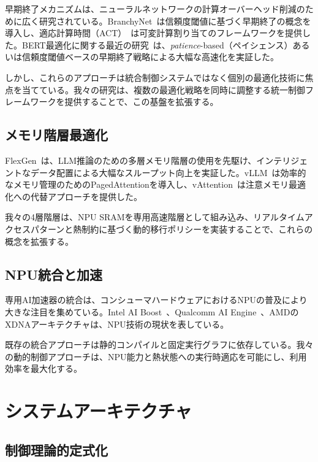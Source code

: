\documentclass[10pt,twocolumn,a4paper]{jarticle}
\begin{document}
早期終了メカニズムは、ニューラルネットワークの計算オーバーヘッド削減のために広く研究されている。BranchyNet~\cite{branchynet2016}は信頼度閾値に基づく早期終了の概念を導入し、適応計算時間（ACT）~\cite{graves2016act}は可変計算割り当てのフレームワークを提供した。BERT最適化に関する最近の研究~\cite{zhou2020bert}は、\emph{patience}-based（ペイシェンス）あるいは信頼度閾値ベースの早期終了戦略による大幅な高速化を実証した。

しかし、これらのアプローチは統合制御システムではなく個別の最適化技術に焦点を当てている。我々の研究は、複数の最適化戦略を同時に調整する統一制御フレームワークを提供することで、この基盤を拡張する。

\subsection{メモリ階層最適化}

FlexGen~\cite{flexgen2023}は、LLM推論のための多層メモリ階層の使用を先駆け、インテリジェントなデータ配置による大幅なスループット向上を実証した。vLLM~\cite{vllm2023}は効率的なメモリ管理のためのPagedAttentionを導入し、vAttention~\cite{vattention2023}は注意メモリ最適化への代替アプローチを提供した。

我々の4層階層は、NPU SRAMを専用高速階層として組み込み、リアルタイムアクセスパターンと熱制約に基づく動的移行ポリシーを実装することで、これらの概念を拡張する。

\subsection{NPU統合と加速}

専用AI加速器の統合は、コンシューマハードウェアにおけるNPUの普及により大きな注目を集めている。Intel AI Boost~\cite{intelai2023}、Qualcomm AI Engine~\cite{qualcommae2023}、AMDのXDNAアーキテクチャは、NPU技術の現状を表している。

既存の統合アプローチは静的コンパイルと固定実行グラフに依存している。我々の動的制御アプローチは、NPU能力と熱状態への実行時適応を可能にし、利用効率を最大化する。

\section{システムアーキテクチャ}

\subsection{制御理論的定式化}
\end{document}
